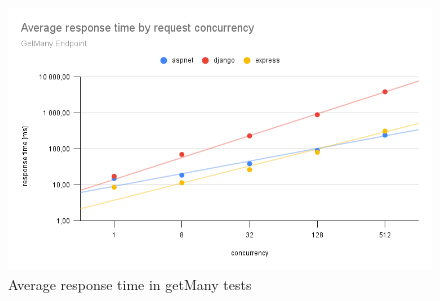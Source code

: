 \begin{figure}[H]
    \includegraphics[width=\columnwidth]{figures/pictures/resultsGetMany.png}
    \caption{Average response time in getMany tests}
    \label{fig:resultsGetMany}
\end{figure}

